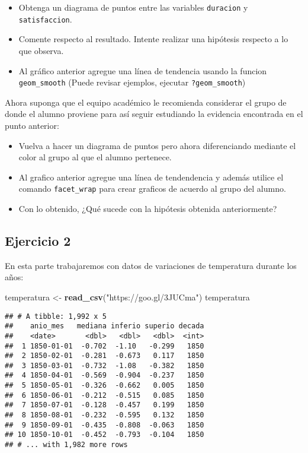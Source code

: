 \documentclass[]{article}
\newenvironment{Shaded}{\begin{snugshade}}{\end{snugshade}}
\newcommand{\KeywordTok}[1]{\textcolor[rgb]{0.13,0.29,0.53}{\textbf{#1}}}
\newcommand{\StringTok}[1]{\textcolor[rgb]{0.31,0.60,0.02}{#1}}
\newcommand{\NormalTok}[1]{#1}
\providecommand{\tightlist}{%
  \setlength{\itemsep}{0pt}\setlength{\parskip}{0pt}}
\begin{document}
\begin{itemize}
\tightlist
\item
  Obtenga un diagrama de puntos entre las variables \texttt{duracion} y
  \texttt{satisfaccion}.
\item
  Comente respecto al resultado. Intente realizar una hipótesis respecto
  a lo que observa.
\item
  Al gráfico anterior agregue una línea de tendencia usando la funcion
  \texttt{geom\_smooth} (Puede revisar ejemplos, ejecutar
  \texttt{?geom\_smooth})
\end{itemize}

Ahora suponga que el equipo académico le recomienda considerar el grupo
de donde el alumno proviene para así seguir estudiando la evidencia
encontrada en el punto anterior:

\begin{itemize}
\tightlist
\item
  Vuelva a hacer un diagrama de puntos pero ahora diferenciando mediante
  el color al grupo al que el alumno pertenece.
\item
  Al grafico anterior agregue una línea de tendendencia y además utilice
  el comando \texttt{facet\_wrap} para crear graficos de acuerdo al
  grupo del alumno.
\item
  Con lo obtenido, ¿Qué sucede con la hipótesis obtenida anteriormente?
\end{itemize}

\subsection{Ejercicio 2}\label{ejercicio-2}

En esta parte trabajaremos con datos de variaciones de temperatura
durante los años:

\begin{Shaded}
\begin{Highlighting}[]
\NormalTok{temperatura <-}\StringTok{ }\KeywordTok{read_csv}\NormalTok{(}\StringTok{"https://goo.gl/3JUCma"}\NormalTok{)}
\NormalTok{temperatura}
\end{Highlighting}
\end{Shaded}

\begin{verbatim}
## # A tibble: 1,992 x 5
##    anio_mes   mediana inferio superio decada
##    <date>       <dbl>   <dbl>   <dbl>  <int>
##  1 1850-01-01  -0.702  -1.10   -0.299   1850
##  2 1850-02-01  -0.281  -0.673   0.117   1850
##  3 1850-03-01  -0.732  -1.08   -0.382   1850
##  4 1850-04-01  -0.569  -0.904  -0.237   1850
##  5 1850-05-01  -0.326  -0.662   0.005   1850
##  6 1850-06-01  -0.212  -0.515   0.085   1850
##  7 1850-07-01  -0.128  -0.457   0.199   1850
##  8 1850-08-01  -0.232  -0.595   0.132   1850
##  9 1850-09-01  -0.435  -0.808  -0.063   1850
## 10 1850-10-01  -0.452  -0.793  -0.104   1850
## # ... with 1,982 more rows
\end{verbatim}
\end{document}
